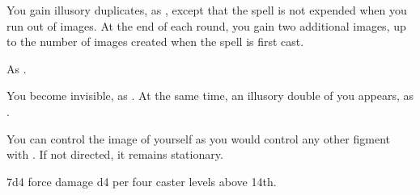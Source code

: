 \begin{spellheader}
    \begin{spelltargetinginfo}
    \end{spelltargetinginfo}
    \begin{spelleffects}
    \end{spelleffects}
\end{spellheader}
\begin{spellcontent}
    \spelleffect You gain illusory duplicates, as , except that the spell is not expended when you run out of images. At the end of each round, you gain two additional images, up to the number of images created when the spell is first cast.
    \spelldur{\durshort \dismissable}
\end{spellcontent}
\begin{spellfooter}
    \spellnotes As .
\end{spellfooter}

\begin{spellheader}
    \begin{spelltargetinginfo}
    \end{spelltargetinginfo}
    \begin{spelleffects}
    \end{spelleffects}
\end{spellheader}
\begin{spellcontent}
    \spelleffect You become invisible, as . At the same time, an illusory double of you appears, as .

    You can control the image of yourself as you would control any other figment with . If not directed, it remains stationary.
    \spelldur{\durshort \dismissable}
\end{spellcontent}
\begin{spellfooter}

\end{spellfooter}

\begin{spellheader}
    \begin{spelltargetinginfo}
    \end{spelltargetinginfo}
    \begin{spelleffects}
    \end{spelleffects}
\end{spellheader}
\begin{spellcontent}
    \spelleffect 7d4 force damage \add d4 per four caster levels above 14th.
\end{spellcontent}
\begin{spellfooter}

\end{spellfooter}

